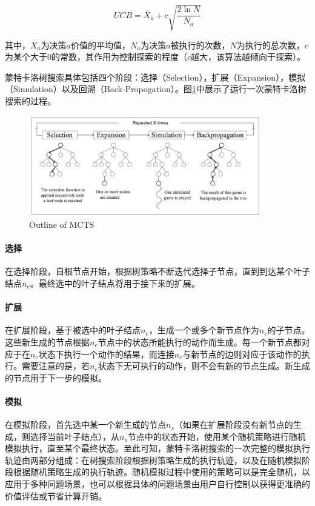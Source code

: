 \begin{equation}
UCB = \overline{X}_{a} + c\sqrt{\frac{2\ln N}{N_a}}
\end{equation}

其中，$\overline{X}_{a}$为决策$a$价值的平均值，$N_a$为决策$a$被执行的次数，$N$为执行的总次数，$c$为某个大于0的常数，其作用为控制探索的程度（$c$越大，该算法越倾向于探索）。

蒙特卡洛树搜索具体包括四个阶段：选择（Selection），扩展（Expansion），模拟（Simulation）以及回溯（Back-Propogation）。图\ref{fig:mcts_process}中展示了运行一次蒙特卡洛树搜索的过程。

\begin{figure}[htb]
\centering
\includegraphics[width=0.9\textwidth]{./figs/mcts_process}
\caption{Outline of MCTS\cite{Sutton2005ReinforcementLA}}
\label{fig:mcts_process}
\end{figure}

\paragraph{选择}
在选择阶段，自根节点开始，根据树策略不断迭代选择子节点，直到到达某个叶子结点$n_e$。最终选中的叶子结点将用于接下来的扩展。
\paragraph{扩展}
在扩展阶段，基于被选中的叶子结点$n_e$，生成一个或多个新节点作为$n_e$的子节点。这些新生成的节点根据$n_e$节点中的状态所能执行的动作而生成。每一个新节点都对应于在$n_e$状态下执行一个动作的结果，而连接$n_e$与新节点的边则对应于该动作的执行。需要注意的是，若$n_e$状态下无可执行的动作，则不会有新的节点生成。新生成的节点用于下一步的模拟。
\paragraph{模拟}
在模拟阶段，首先选中某一个新生成的节点$n_s$（如果在扩展阶段没有新节点的生成，则选择当前叶子结点），从$n_s$节点中的状态开始，使用某个随机策略进行随机模拟执行，直至某个最终状态。至此可知，蒙特卡洛树搜索的一次完整的模拟执行轨迹由两部分组成：在树搜索阶段根据树策略生成的执行轨迹，以及在随机模拟阶段根据随机策略生成的执行轨迹。随机模拟过程中使用的策略可以是完全随机，以应用于多种问题场景，也可以根据具体的问题场景由用户自行控制以获得更准确的价值评估或节省计算开销。
